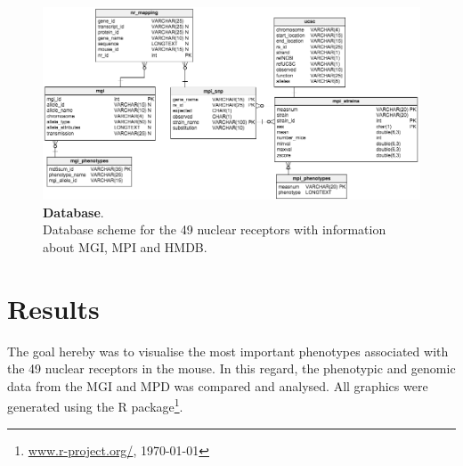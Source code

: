 \documentclass[fleqn,11pt]{SelfArx}
\begin{document}
\begin{figure}[H]
	\centering
	\includegraphics[width=\linewidth]{pics/db.png}
	\captionsetup{margin=12pt,format=plain,font=footnotesize,labelfont=bf}
 	\caption{\footnotesize{\textbf{Database}. 
	~~~~~~~\\
	Database scheme for the 49 nuclear receptors with information about MGI, MPI and HMDB.}}
	\label{fig:database}
\end{figure}


\section{Results}
The goal hereby was to visualise the most important phenotypes associated with the 49 nuclear receptors in the mouse. In this regard, the phenotypic and genomic data from the MGI and MPD was compared and analysed. All graphics were generated using the R package\footnote{\url{www.r-project.org/}, \today}.
\end{document}
